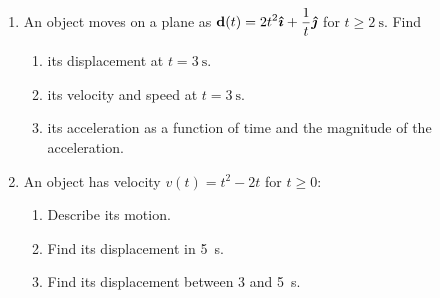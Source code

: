 \documentclass{../../oss-apphys}
\begin{document}
\begin{enumerate}[leftmargin=15pt]
\item An object moves on a plane as
  $\displaystyle \mathbf{d}(t)=2t^2\bm{\hat{\imath}}+\frac{1}{t}\bm{\hat{\jmath}}$
  for $t\geq\SI{2}{\s}$. Find
  \begin{enumerate}[noitemsep,topsep=0pt]
  \item its displacement at $t=\SI{3}{\s}$.
  \item its velocity and speed at $t=\SI{3}{\s}$.
  \item its acceleration as a function of time and the magnitude of the
    acceleration.
  \end{enumerate}
  \vspace{3.5in}
  
\item An object has velocity $v(t)=t^2-2t$ for $t\geq 0$:
  \begin{enumerate}[noitemsep,topsep=0pt]
  \item Describe its motion.
  \item Find its displacement in \SI{5}{\second}.
  \item Find its displacement between \num{3} and \SI{5}{\second}.
  \end{enumerate}
\end{enumerate}
\end{document}
